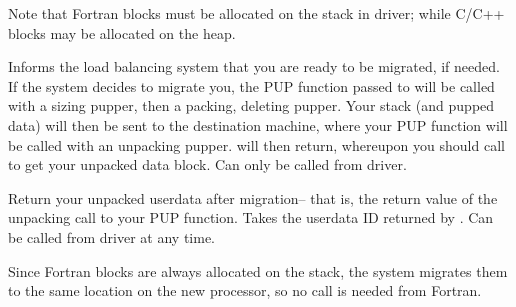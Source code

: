 \documentclass[10pt]{article}
\begin{document}
     Note that Fortran blocks must be allocated on the stack in driver;
     while C/C++ blocks may be allocated on the heap.
\vspace{0.2in}


     Informs the load balancing system that you are ready to be
     migrated, if needed.  If the system decides to migrate you, the
     PUP function passed to  will be called with a sizing
     pupper, then a packing, deleting pupper.  Your stack (and pupped
     data) will then be sent to the destination machine, where your PUP
     function will be called with an unpacking pupper.  
     will then return, whereupon you should call  to
     get your unpacked data block.  Can only be called from driver.




     Return your unpacked userdata after migration-- that is, the
     return value of the unpacking call to your PUP function.  Takes
     the userdata ID returned by .  Can be called from
     driver at any time.

     Since Fortran blocks are always allocated on the stack, the system
     migrates them to the same location on the new processor, so no
      call is needed from Fortran.

\end{document}
